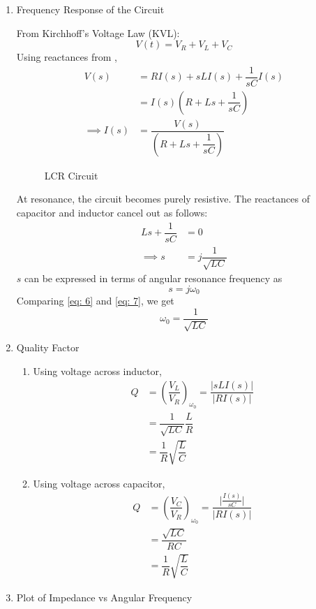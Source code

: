 \documentclass[journal,12pt,twocolumn]{IEEEtran}
\theoremstyle{remark}
\begin{document}
\begin{enumerate}
\item {Frequency Response of the Circuit}

From Kirchhoff's Voltage Law (KVL):
\begin{equation}
V(t) = V_R + V_L + V_C \label{eq:KVL}
\end{equation}
Using reactances from ,
\begin{align}
    V(s) &= R I(s) + sL I(s) + \dfrac{1}{sC} I(s)\\
    &= I(s)\left(R + Ls + \dfrac{1}{sC}\right)\\
    \implies I(s) &= \dfrac{V(s)}{\left(R + Ls + \dfrac{1}{sC}\right)} \label{eq: 4}
\end{align}
\begin{figure}[!h]
 \centering
    
    \caption{LCR Circuit}
    \label{fig:2}
\end{figure}
At resonance, the circuit becomes purely resistive. The reactances of capacitor and inductor cancel out as follows:
\begin{align}
    Ls + \dfrac{1}{sC} &= 0\\
    \implies s &= j\dfrac{1}{\sqrt{LC}} \label{eq: 6}
\end{align}
$s$ can be expressed in terms of angular resonance frequency as
\begin{equation}
    s = j\omega_0 \label{eq: 7}
\end{equation}
Comparing \eqref{eq: 6} and \eqref{eq: 7}, we get
\begin{equation}
    \omega_0 = \dfrac{1}{\sqrt{LC}}
\end{equation}
\item{Quality Factor}

\begin{enumerate}
\item Using voltage across inductor,
\begin{align}
    Q &= \left(\dfrac{V_L}{V_R}\right)_{\omega_0} = \dfrac{\lvert{sLI(s)}\rvert}{\lvert RI(s) \rvert}\\
    &= \dfrac{1}{\sqrt{LC}}\dfrac{L}{R}\\
    &= \dfrac{1}{R}\sqrt{\dfrac{L}{C}}
\end{align}
\item Using voltage across capacitor,
\begin{align}
    Q &= \left(\dfrac{V_C}{V_R}\right)_{\omega_0} = \dfrac{\lvert{\frac{I(s)}{sC}}\rvert}{\lvert RI(s) \rvert}\\
    &= \dfrac{\sqrt{LC}}{RC}\\
    &= \dfrac{1}{R}\sqrt{\dfrac{L}{C}}
\end{align}
\end{enumerate}
\item{Plot of Impedance vs Angular Frequency}


\end{enumerate}
\end{document}
